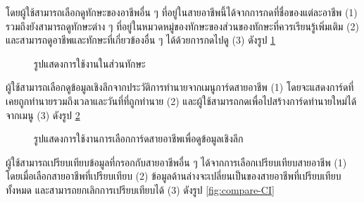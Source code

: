 โดยผู้ใช้สามารถเลือกดูทักษะของอาชีพอื่น ๆ ที่อยู่ในสายอาชีพนี้ได้จากการกดที่ชื่อของแต่ละอาชีพ (1) รวมถึงยังสามารถดูทักษะต่าง ๆ ที่อยู่ในหมวดหมู่ของทักษะของส่วนของทักษะที่ควรเรียนรู้เพิ่มเติม (2) และสามารถดูอาชีพและทักษะที่เกี่ยวข้องอื่น ๆ ได้ด้วยการกดไปดู (3) ดังรูป \ref{fig:skillaction-CI}
\begin{figure}[H]\centering
    \caption{รูปแสดงการใช้งานในส่วนทักษะ}\label{fig:skillaction-CI}
\end{figure}
ผู้ใช้สามารถเลือกดูข้อมูลเชิงลึกจากประวัติการทำนายจากเมนูการ์ดสายอาชีพ (1) โดยจะแสดงการ์ดที่เคยถูกทำนายรวมถึงเวลาและวันที่ที่ถูกทำนาย (2) และผู้ใช้สามารถกดเพื่อไปสร้างการ์ดทำนายใหม่ได้จากเมนู (3) ดังรูป \ref{fig:cardhistory-CI}
\begin{figure}[H]\centering
    \caption{รูปแสดงการใช้งานการเลือกการ์ดสายอาชีพเพื่อดูข้อมูลเชิงลึก}\label{fig:cardhistory-CI}
\end{figure}
ผู้ใช้สามารถเปรียบเทียบข้อมูลที่กรอกกับสายอาชีพอื่น ๆ ได้จากการเลือกเปรียบเทียบสายอาชีพ (1) โดยเมื่อเลือกสายอาชีพที่เปรียบเทียบ (2) ข้อมูลด้านล่างจะเปลี่ยนเป็นของสายอาชีพที่เปรียบเทียบทั้งหมด และสามารถยกเลิกการเปรียบเทียบได้ (3) ดังรูป \ref{fig:compare-CI}
